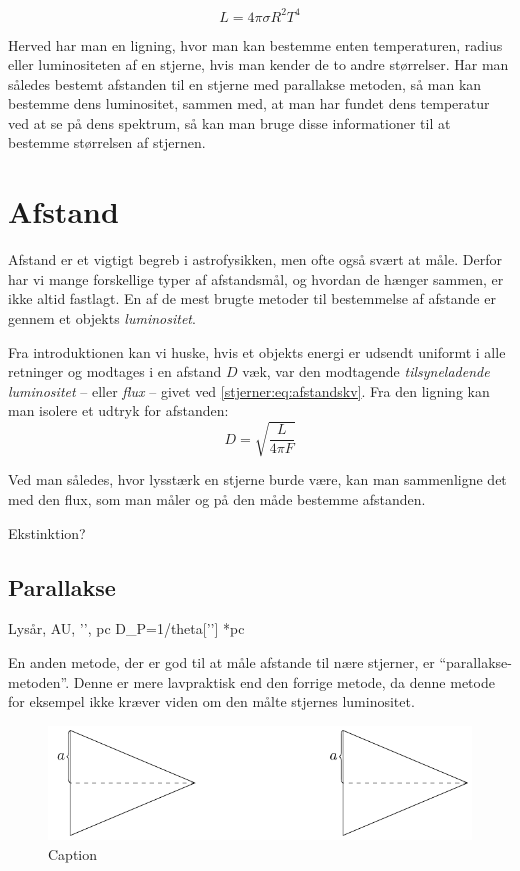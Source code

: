 \documentclass[crop=false, class=memoir]{standalone}
\begin{document}
\begin{equation}\label{stjerner:eq:stefanboltzmannligning}
    L = 4\pi\sigma R^2 T^4
\end{equation}

Herved har man en ligning, hvor man kan bestemme enten temperaturen, radius eller luminositeten af en stjerne, hvis man kender de to andre størrelser. Har man således bestemt afstanden til en stjerne med parallakse metoden, så man kan bestemme dens luminositet, sammen med, at man har fundet dens temperatur ved at se på dens spektrum, så kan man bruge disse informationer til at bestemme størrelsen af stjernen.

\section{Afstand}
Afstand er et vigtigt begreb i astrofysikken, men ofte også svært at måle. Derfor har vi mange forskellige typer af afstandsmål, og hvordan de hænger sammen, er ikke altid fastlagt. En af de mest brugte metoder til bestemmelse af afstande er gennem et objekts \emph{luminositet}. 

Fra introduktionen kan vi huske, hvis et objekts energi er udsendt uniformt i alle retninger og modtages i en afstand $D$ væk, var den modtagende \emph{tilsyneladende luminositet} -- eller \emph{flux} -- givet ved \cref{stjerner:eq:afstandskv}. Fra den ligning kan man isolere et udtryk for afstanden:
\begin{equation} \label{stjerner:eq:L}
D = \sqrt{\frac{L}{4\pi F}}
\end{equation}

Ved man således, hvor lysstærk en stjerne burde være, kan man sammenligne det med den flux, som man måler og på den måde bestemme afstanden. 

Ekstinktion?



\subsection{Parallakse}
Lysår, AU, ’’, pc
D\_P=1/theta[’’] *pc 

En anden metode, der er god til at måle afstande til nære stjerner, er ``parallakse-metoden''. Denne er mere lavpraktisk end den forrige metode, da denne metode for eksempel ikke kræver viden om den målte stjernes luminositet. 

\begin{figure}[H]
    \centering
    \includegraphics{fig/Parallakse.pdf}
    \caption{Caption}
    \label{stjernerfig:parallakse}
\end{figure}{}
\end{document}
